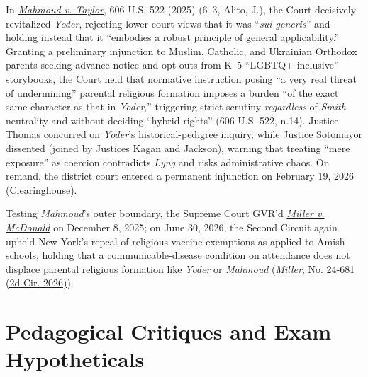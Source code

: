 \documentclass[12pt]{article}
\begin{document}
In \href{https://www.law.cornell.edu/supremecourt/text/24-297}{\emph{Mahmoud v. Taylor}}, 606 U.S. 522 (2025) (6--3, Alito, J.), the Court decisively revitalized \emph{Yoder}, rejecting lower-court views that it was ``\emph{sui generis}'' and holding instead that it ``embodies a robust principle of general applicability.'' Granting a preliminary injunction to Muslim, Catholic, and Ukrainian Orthodox parents seeking advance notice and opt-outs from K--5 ``LGBTQ+-inclusive'' storybooks, the Court held that normative instruction posing ``a very real threat of undermining'' parental religious formation imposes a burden ``of the exact same character as that in \emph{Yoder},'' triggering strict scrutiny \emph{regardless} of \emph{Smith} neutrality and without deciding ``hybrid rights'' (606 U.S. 522, n.14). Justice Thomas concurred on \emph{Yoder}'s historical-pedigree inquiry, while Justice Sotomayor dissented (joined by Justices Kagan and Jackson), warning that treating ``mere exposure'' as coercion contradicts \emph{Lyng} and risks administrative chaos. On remand, the district court entered a permanent injunction on February 19, 2026 (\href{https://clearinghouse.net/case/46034/}{Clearinghouse}).

Testing \emph{Mahmoud}'s outer boundary, the Supreme Court GVR'd \href{https://www.scotusblog.com/cases/miller-v-mcdonald/}{\emph{Miller v. McDonald}} on December 8, 2025; on June 30, 2026, the Second Circuit again upheld New York's repeal of religious vaccine exemptions as applied to Amish schools, holding that a communicable-disease condition on attendance does not displace parental religious formation like \emph{Yoder} or \emph{Mahmoud} (\href{https://law.justia.com/cases/federal/appellate-courts/ca2/24-681/24-681-2026-06-30.html}{\emph{Miller}, No. 24-681 (2d Cir. 2026)}).

\section{Pedagogical Critiques and Exam Hypotheticals}
\end{document}
